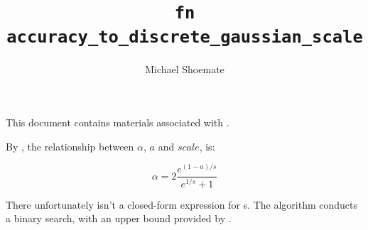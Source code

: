 \documentclass{article}
\title{\texttt{fn accuracy\_to\_discrete\_gaussian\_scale}}
\author{Michael Shoemate}
\begin{document}
\maketitle

This document contains materials associated with .

By , 
the relationship between $\alpha$, $a$ and $scale$, is:

\begin{equation*}
    \alpha = 2 \frac{e^{(1 - a)/s}}{e^{1/s} + 1}
\end{equation*}

There unfortunately isn't a closed-form expression for s.
The algorithm conducts a binary search, 
with an upper bound provided by .
\end{document}
